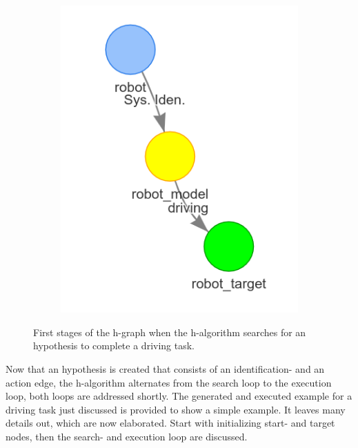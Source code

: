\begin{figure}[h]
\begin{subfigure}{.3\textwidth}
    \end{subfigure}
    \begin{subfigure}{.3\textwidth}
    \centering
    \includegraphics[width=\textwidth]{figures/proposed_method/connecting_nodes/robot_to_target/robot_iden_drive_target}
    \end{subfigure}
    \caption{First stages of the \ac{h-graph} when the \ac{h-algorithm} searches for an hypothesis to complete a driving task.}%
    \label{fig:robot_drive_h-graph}
\end{figure}

Now that an hypothesis is created that consists of an identification- and an action edge, the \ac{h-algorithm} alternates from the search loop to the execution loop, both loops are addressed shortly. The generated and executed example for a driving task just discussed is provided to show a simple example. It leaves many details out, which are now elaborated. Start with initializing start- and target nodes, then the search- and execution loop are discussed.\bs

